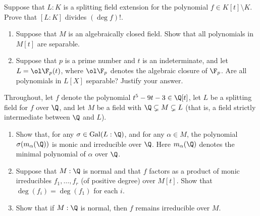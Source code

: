 \documentclass{article}
\begin{document}
 Suppose that \( L : K \) is a splitting field extension for the polynomial \( f \in K[t] \setminus K \). Prove that \( [L : K] \) divides \( (\deg f)! \).

\begin{enumerate}[label=(\alph*)]
  \item Suppose that \( M \) is an algebraically closed field. Show that all polynomials in \( M[t] \) are separable.

  \item Suppose that \( p \) is a prime number and \( t \) is an indeterminate, and let \( L = \ol \F_p(t) \), where \( \ol \F_p \) denotes the algebraic closure of \( \F_p \). Are all polynomials in \( L[X] \) separable? Justify your answer.
\end{enumerate}


 Throughout, let \( f \) denote the polynomial \( t^5 - 9t - 3 \in \Q[t] \), let \( L \) be a splitting field for \( f \) over \( \Q \), and let \( M \) be a field with \( \Q \subsetneq M \subsetneq L \) (that is, a field strictly intermediate between \( \Q \) and \( L \)).
\begin{enumerate}[label=(\alph*)]
  \item Show that, for any \( \sigma \in \mathrm{Gal}(L : \Q) \), and for any \( \alpha \in M \), the polynomial \( \sigma(m_\alpha(\Q)) \) is monic and irreducible over \( \Q \). Here \( m_\alpha(\Q) \) denotes the minimal polynomial of \( \alpha \) over \( \Q \).

  \item Suppose that \( M : \Q \) is normal and that \( f \) factors as a product of monic irreducibles \( f_1, \dots, f_r \) (of positive degree) over \( M[t] \). Show that \( \deg(f_i) = \deg(f_1) \) for each \( i \).

  \item Show that if \( M : \Q \) is normal, then \( f \) remains irreducible over \( M \).
\end{enumerate}
\end{document}

